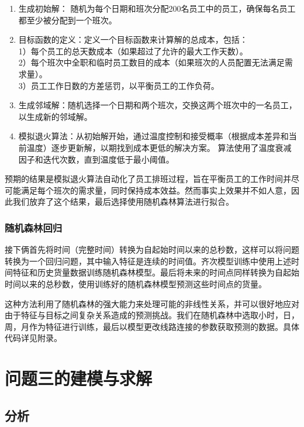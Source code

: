 \documentclass[UTF8]{article}%
\begin{document}
\begin{enumerate}
    \item 生成初始解：
    随机为每个日期和班次分配200名员工中的员工，确保每名员工都至少被分配到一个班次。
    \item 目标函数的定义：定义一个目标函数来计算解的总成本，包括：\\
    \hspace*{1cm}1）每个员工的总天数成本（如果超过了允许的最大工作天数）。\\
    \hspace*{1cm}2）每个班次中全职和临时员工数目的成本（如果班次的人员配置无法满足需求量）。\\ 
    \hspace*{1cm}3）员工工作日数的方差惩罚，以平衡员工的工作负荷。
    \item 生成邻域解：随机选择一个日期和两个班次，交换这两个班次中的一名员工，以生成新的邻域解。
    \item 模拟退火算法：从初始解开始，通过温度控制和接受概率（根据成本差异和当前温度）逐步更新解，以期找到成本更低的解决方案。
    算法使用了温度衰减因子和迭代次数，直到温度低于最小阈值。
\end{enumerate}

预期的结果是模拟退火算法自动化了员工排班过程，旨在平衡员工的工作时间并尽可能满足每个班次的需求量，同时保持成本效益。然而事实上效果并不如人意，因此我们放弃了这个结果，最后选择使用随机森林算法进行拟合。

\subsubsection{随机森林回归}
接下俩首先将时间（完整时间）转换为自起始时间以来的总秒数，这样可以将问题转换为一个回归问题，其中输入特征是连续的时间值。齐次模型训练中使用上述时间特征和历史货量数据训练随机森林模型。最后将未来的时间点同样转换为自起始时间以来的总秒数，使用训练好的随机森林模型预测这些时间点的货量。

这种方法利用了随机森林的强大能力来处理可能的非线性关系，并可以很好地应对由于特征与目标之间复杂关系造成的预测挑战。我们在随机森林中选取小时，日，周，月作为特征进行训练，最后以模型更改线路连接的参数获取预测的数据。具体代码详见附录。



\clearpage
\section{问题三的建模与求解}

\subsection{分析}
\end{document}
